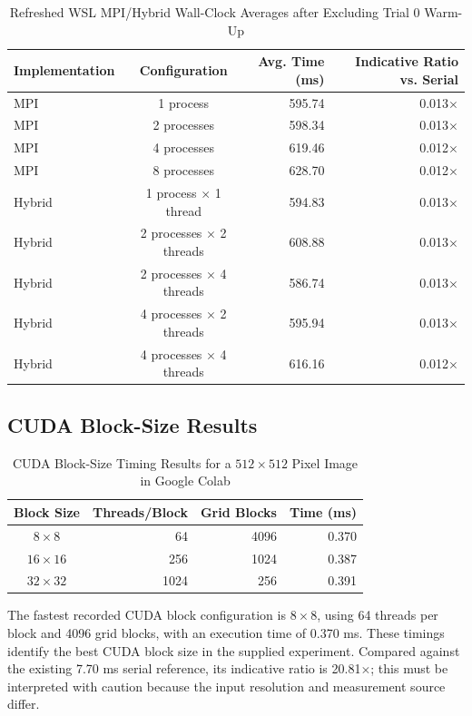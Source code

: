 \documentclass[12pt,a4paper]{report}
\begin{document}
\begin{table}[H]
    \centering
    \scriptsize
    \begin{tabular}{|l|c|r|r|}
    \hline
    \textbf{Implementation} & \textbf{Configuration} & \textbf{Avg. Time (ms)} & \textbf{Indicative Ratio vs. Serial} \\
    \hline
    MPI & 1 process & 595.74 & 0.013$\times$ \\
    MPI & 2 processes & 598.34 & 0.013$\times$ \\
    MPI & 4 processes & 619.46 & 0.012$\times$ \\
    MPI & 8 processes & 628.70 & 0.012$\times$ \\
    \hline
    Hybrid & 1 process $\times$ 1 thread & 594.83 & 0.013$\times$ \\
    Hybrid & 2 processes $\times$ 2 threads & 608.88 & 0.013$\times$ \\
    Hybrid & 2 processes $\times$ 4 threads & 586.74 & 0.013$\times$ \\
    Hybrid & 4 processes $\times$ 2 threads & 595.94 & 0.013$\times$ \\
    Hybrid & 4 processes $\times$ 4 threads & 616.16 & 0.012$\times$ \\
    \hline
    \end{tabular}
    \caption{Refreshed WSL MPI/Hybrid Wall-Clock Averages after Excluding Trial 0 Warm-Up}
\end{table}

\subsection{CUDA Block-Size Results}

\begin{table}[H]
    \centering
    \begin{tabular}{|c|r|r|r|}
    \hline
    \textbf{Block Size} & \textbf{Threads/Block} & \textbf{Grid Blocks} & \textbf{Time (ms)} \\
    \hline
    $8 \times 8$ & 64 & 4096 & 0.370 \\
    $16 \times 16$ & 256 & 1024 & 0.387 \\
    $32 \times 32$ & 1024 & 256 & 0.391 \\
    \hline
    \end{tabular}
    \caption{CUDA Block-Size Timing Results for a $512 \times 512$ Pixel Image in Google Colab}
\end{table}

The fastest recorded CUDA block configuration is $8 \times 8$, using 64 threads per block
and 4096 grid blocks, with an execution time of 0.370 ms. These timings identify the best
CUDA block size in the supplied experiment. Compared against the existing 7.70 ms serial
reference, its indicative ratio is 20.81$\times$; this must be interpreted with caution
because the input resolution and measurement source differ.
\end{document}
